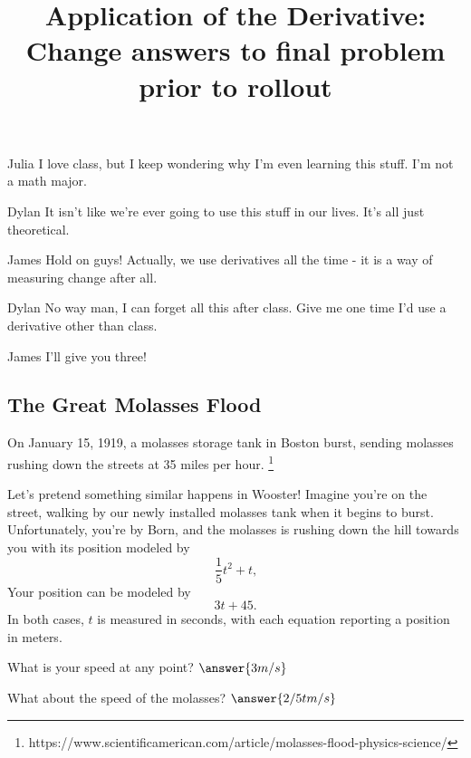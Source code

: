 \documentclass{ximera}
\title{Application of the Derivative: Change answers to final problem prior to rollout}
\begin{document}
\maketitle
\begin{dialogue}
\item[Julia] I love class, but I keep wondering why I'm even learning this stuff. I'm not a math major.
\item[Dylan] It isn't like we're ever going to use this stuff in our lives. It's all just theoretical.
\item[James] Hold on guys! Actually, we use derivatives all the time - it is a way of measuring change after all.
\item[Dylan] No way man, I can forget all this after class. Give me one time I'd use a derivative other than class.
\item[James] I'll give you three!
\end{dialogue}
\subsection{The Great Molasses Flood}
On January 15, 1919, a molasses storage tank in Boston burst, sending molasses rushing down the streets at 35 miles per hour. \footnote{https://www.scientificamerican.com/article/molasses-flood-physics-science/}

Let's pretend something similar happens in Wooster! Imagine you're on the street, walking by our newly installed molasses tank when it begins to burst. Unfortunately, you're by Born, and the molasses is rushing down the hill towards you with its position modeled by $$\frac{1}{5}t^2+t \text{,}$$ Your position can be modeled by $$3t+45 \text{.}$$ In both cases, $t$ is measured in seconds, with each equation reporting a position in meters.

\setcounter{problem}{0}
\begin{question}
What is your speed at any point?  $\answer{3 m/s}$

What about the speed of the molasses? $\answer{2/5 t m/s}$
\end{question}
\end{document}
